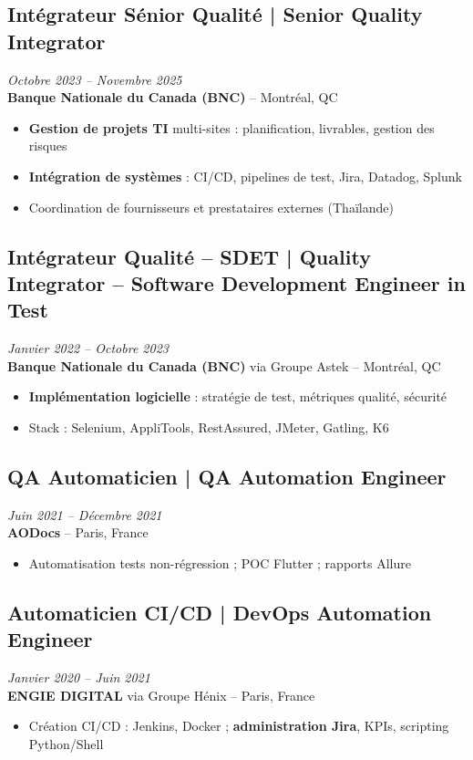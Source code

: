 \documentclass[11pt,a4paper]{article}
\begin{document}
\subsection*{Intégrateur Sénior Qualité | Senior Quality Integrator} \hfill \textit{Octobre 2023 -- Novembre 2025}\\
\textbf{Banque Nationale du Canada (BNC)} -- Montréal, QC\\
\begin{itemize}
    \item \textbf{Gestion de projets TI} multi-sites : planification, livrables, gestion des risques
    \item \textbf{Intégration de systèmes} : CI/CD, pipelines de test, Jira, Datadog, Splunk
    \item Coordination de fournisseurs et prestataires externes (Thaïlande)
\end{itemize}

\subsection*{Intégrateur Qualité -- SDET | Quality Integrator -- Software Development Engineer in Test} \hfill \textit{Janvier 2022 -- Octobre 2023}\\
\textbf{Banque Nationale du Canada (BNC)} via Groupe Astek -- Montréal, QC\\
\begin{itemize}
    \item \textbf{Implémentation logicielle} : stratégie de test, métriques qualité, sécurité
    \item Stack : Selenium, AppliTools, RestAssured, JMeter, Gatling, K6
\end{itemize}

\subsection*{QA Automaticien | QA Automation Engineer} \hfill \textit{Juin 2021 -- Décembre 2021}\\
\textbf{AODocs} -- Paris, France\\
\begin{itemize}
    \item Automatisation tests non-régression ; POC Flutter ; rapports Allure
\end{itemize}

\subsection*{Automaticien CI/CD | DevOps Automation Engineer} \hfill \textit{Janvier 2020 -- Juin 2021}\\
\textbf{ENGIE DIGITAL} via Groupe Hénix -- Paris, France\\
\begin{itemize}
    \item Création CI/CD : Jenkins, Docker ; \textbf{administration Jira}, KPIs, scripting Python/Shell
\end{itemize}
\end{document}
